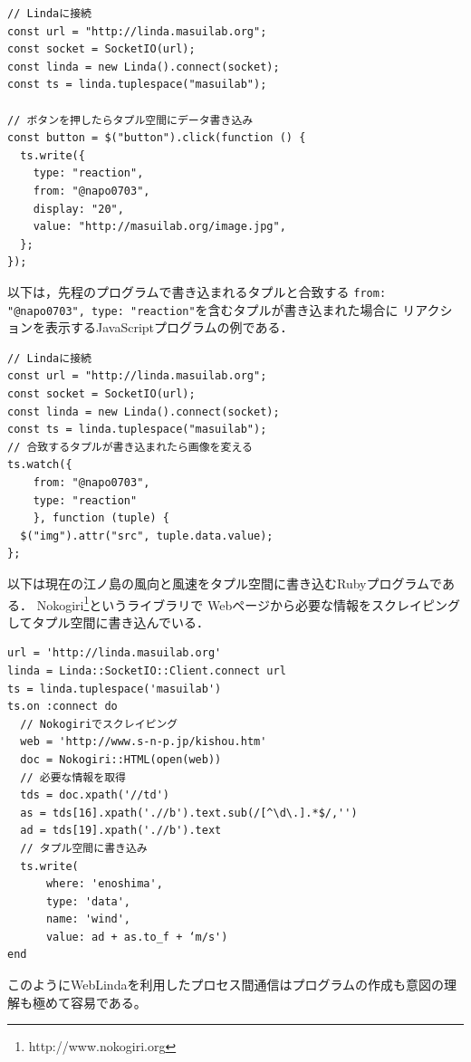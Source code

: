 \vspace{4mm}
\begin{lstlisting}
// Lindaに接続
const url = "http://linda.masuilab.org";
const socket = SocketIO(url);
const linda = new Linda().connect(socket);
const ts = linda.tuplespace("masuilab");

// ボタンを押したらタプル空間にデータ書き込み
const button = $("button").click(function () {
  ts.write({
    type: "reaction",
    from: "@napo0703",
    display: "20",
    value: "http://masuilab.org/image.jpg",
  };
});
\end{lstlisting}
以下は，先程のプログラムで書き込まれるタプルと合致する
\texttt{{from: "@napo0703", type: "reaction"}}を含むタプルが書き込まれた場合に
リアクションを表示するJavaScriptプログラムの例である．
\vspace{4mm}
\begin{lstlisting}
// Lindaに接続
const url = "http://linda.masuilab.org";
const socket = SocketIO(url);
const linda = new Linda().connect(socket);
const ts = linda.tuplespace("masuilab");
// 合致するタプルが書き込まれたら画像を変える
ts.watch({
    from: "@napo0703",
    type: "reaction"
    }, function (tuple) {
  $("img").attr("src", tuple.data.value);
};
\end{lstlisting}
\vspace{4mm}
以下は現在の江ノ島の風向と風速をタプル空間に書き込むRubyプログラムである．
Nokogiri\footnote{http://www.nokogiri.org}というライブラリで
Webページから必要な情報をスクレイピングしてタプル空間に書き込んでいる．
\vspace{2mm}
\begin{lstlisting}
url = 'http://linda.masuilab.org'
linda = Linda::SocketIO::Client.connect url
ts = linda.tuplespace('masuilab')
ts.on :connect do
  // Nokogiriでスクレイピング
  web = 'http://www.s-n-p.jp/kishou.htm'
  doc = Nokogiri::HTML(open(web))
  // 必要な情報を取得
  tds = doc.xpath('//td')
  as = tds[16].xpath('.//b').text.sub(/[^\d\.].*$/,'')
  ad = tds[19].xpath('.//b').text
  // タプル空間に書き込み
  ts.write(
      where: 'enoshima',
      type: 'data',
      name: 'wind',
      value: ad + as.to_f + ‘m/s')
end
\end{lstlisting}

このようにWebLindaを利用したプロセス間通信はプログラムの作成も意図の理解も極めて容易である。
